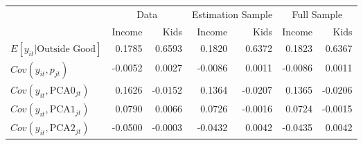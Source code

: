 \begin{tabular}{lrrrrrr}
\toprule
& \multicolumn{2}{c}{Data} &
 \multicolumn{2}{c}{Estimation Sample} &
 \multicolumn{2}{c}{Full Sample} \\ 
{} &  Income &    Kids &  Income &    Kids &  Income &    Kids \\
\midrule
$E[ y_{it} | \text{Outside Good}]$ &  0.1785 &  0.6593 &  0.1820 &  0.6372 &  0.1823 &  0.6367 \\
$Cov(y_{it}, p_{jt})$              & -0.0052 &  0.0027 & -0.0086 &  0.0011 & -0.0086 &  0.0011 \\
$Cov(y_{it}, \text{PCA0}_{jt})$    &  0.1626 & -0.0152 &  0.1364 & -0.0207 &  0.1365 & -0.0206 \\
$Cov(y_{it}, \text{PCA1}_{jt})$    &  0.0790 &  0.0066 &  0.0726 & -0.0016 &  0.0724 & -0.0015 \\
$Cov(y_{it}, \text{PCA2}_{jt})$    & -0.0500 & -0.0003 & -0.0432 &  0.0042 & -0.0435 &  0.0042 \\
\bottomrule
\end{tabular}
